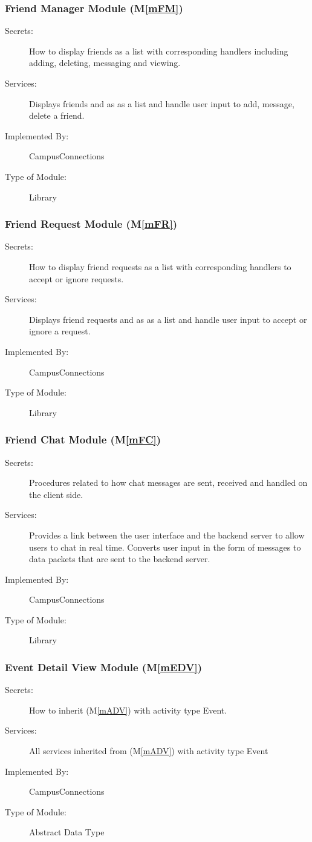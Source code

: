 \documentclass[12pt, titlepage]{article}
\newcommand{\mref}[1]{M\ref{#1}}
\begin{document}
\subsubsection{Friend Manager Module (\mref{mFM})}
\begin{description}
\item[Secrets:]How to display friends as a list with corresponding handlers including adding, deleting, messaging and viewing.
\item[Services:]Displays friends and as as a list and handle user input to add, message, delete a friend.
\item[Implemented By:] CampusConnections
\item[Type of Module:] Library
\end{description}

\subsubsection{Friend Request Module (\mref{mFR})}
\begin{description}
\item[Secrets:]How to display friend requests as a list with corresponding handlers to accept or ignore requests.
\item[Services:]Displays friend requests and as as a list and handle user input to accept or ignore a request.
\item[Implemented By:] CampusConnections
\item[Type of Module:] Library
\end{description}

\subsubsection{Friend Chat Module (\mref{mFC})}
\begin{description}
\item[Secrets:]Procedures related to how chat messages are sent, received and handled on the client side.
\item[Services:]Provides a link between the user interface and the backend server to allow users to chat in real time. Converts user input in the form of messages to data packets that are sent to the backend server.
\item[Implemented By:] CampusConnections
\item[Type of Module:] Library
\end{description}

\subsubsection{Event Detail View Module (\mref{mEDV})}
\begin{description}
\item[Secrets:]How to inherit (\mref{mADV}) with activity type Event.
\item[Services:]All services inherited from (\mref{mADV}) with activity type Event
\item[Implemented By:] CampusConnections
\item[Type of Module:] Abstract Data Type
\end{description}
\end{document}
